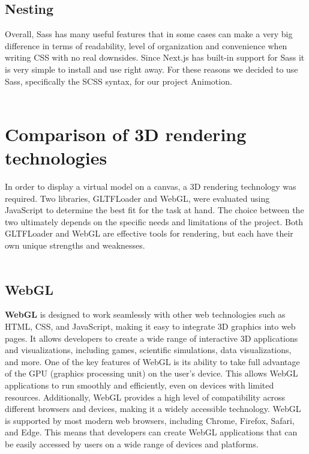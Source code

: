 \subsection{Nesting}
Overall, Sass has many useful features that in some cases can make a very big difference in terms of readability, level of organization and
convenience when writing CSS with no real downsides. Since Next.js has built-in support for Sass it is very simple to install and use right
away. For these reasons we decided to use Sass, specifically the SCSS syntax, for our project Animotion.
\\
\\
\section{Comparison of 3D rendering technologies}
In order to display a virtual model on a canvas, a 3D rendering technology was required. Two libraries, 
GLTFLoader and WebGL, were evaluated using JavaScript to determine the best fit for the task at hand. 
The choice between the two ultimately depends on the specific needs and limitations of the project. 
Both GLTFLoader and WebGL are effective tools for rendering, but each have their own 
unique strengths and weaknesses.
\\
\\
\subsection{WebGL}
\textbf{WebGL} is designed to work seamlessly with other web technologies such as HTML, CSS, and JavaScript, 
making it easy to integrate 3D graphics into web pages. It allows developers to create a wide range 
of interactive 3D applications and visualizations, including games, scientific 
simulations, data visualizations, and more.
One of the key features of WebGL is its ability to take full advantage of the GPU 
(graphics processing unit) on the user's device. This allows WebGL applications to 
run smoothly and efficiently, even on devices with limited resources. Additionally, WebGL provides 
a high level of compatibility across different browsers and devices, making it a widely accessible technology.
WebGL is supported by most modern web browsers, including Chrome, Firefox, Safari, and Edge. 
This means that developers can create WebGL applications that can be easily accessed by 
users on a wide range of devices and platforms. \cite{WebGL}
\\
\\
